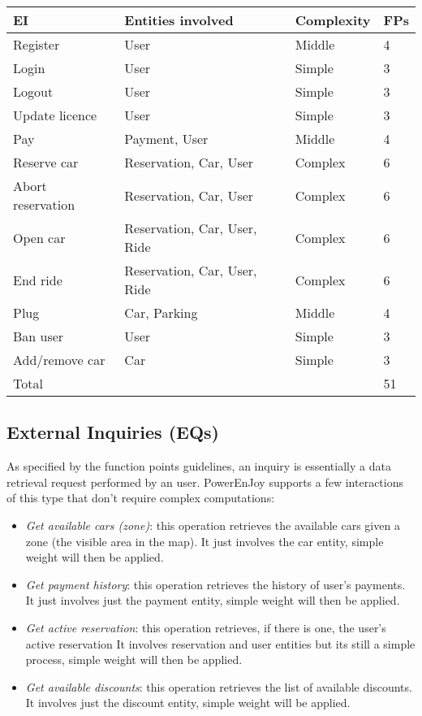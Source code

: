 \begin{table}[H]
	\centering
	\begin{tabular}{|l|l|l|l|}
		\hline
		EI & Entities involved & Complexity & FPs \\
		\hline
		Register & User & Middle & 4 \\
		Login & User & Simple & 3 \\
		Logout & User & Simple & 3 \\
		Update licence & User & Simple & 3 \\
		Pay & Payment, User & Middle & 4 \\
		Reserve car & Reservation, Car, User & Complex & 6 \\
		Abort reservation & Reservation, Car, User & Complex & 6 \\
		Open car & Reservation, Car, User, Ride & Complex & 6 \\
		End ride & Reservation, Car, User, Ride & Complex & 6 \\
		Plug & Car, Parking & Middle & 4 \\
		Ban user & User & Simple & 3 \\
		Add/remove car & Car & Simple & 3 \\
		\hline
		\multicolumn{3}{|l|}{Total} & 51 \\
		\hline	
	\end{tabular}
\end{table}

\subsection{External Inquiries (EQs)}
As specified by the function points guidelines, an inquiry is essentially a data retrieval
request performed by an user. PowerEnJoy supports a few interactions of this type that don’t require
complex computations:
\begin{itemize}
	\item \emph{Get available cars (zone)}: this operation retrieves the available cars given a zone (the visible area in the map). It just involves the car entity, simple weight will then be applied.
	\item \emph{Get payment history}: this operation retrieves the history of user's payments. It just involves just the payment entity, simple weight will then be applied.
	\item \emph{Get active reservation}: this operation retrieves, if there is one, the user's active reservation It involves reservation and user entities but its still a simple process, simple weight will then be applied.
	\item \emph{Get available discounts}: this operation retrieves the list of available discounts. It involves just the discount entity, simple weight will be applied.
\end{itemize}

